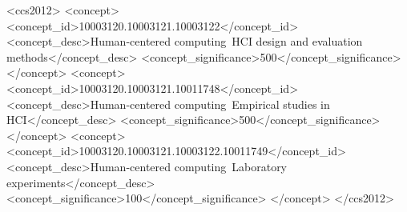 \documentclass[sigconf]{acmart}
\begin{document}
%
%
\begin{CCSXML}
<ccs2012>
<concept>
<concept_id>10003120.10003121.10003122</concept_id>
<concept_desc>Human-centered computing~HCI design and evaluation methods</concept_desc>
<concept_significance>500</concept_significance>
</concept>
<concept>
<concept_id>10003120.10003121.10011748</concept_id>
<concept_desc>Human-centered computing~Empirical studies in HCI</concept_desc>
<concept_significance>500</concept_significance>
</concept>
<concept>
<concept_id>10003120.10003121.10003122.10011749</concept_id>
<concept_desc>Human-centered computing~Laboratory experiments</concept_desc>
<concept_significance>100</concept_significance>
</concept>
</ccs2012>
\end{CCSXML}





\maketitle





\end{document}
